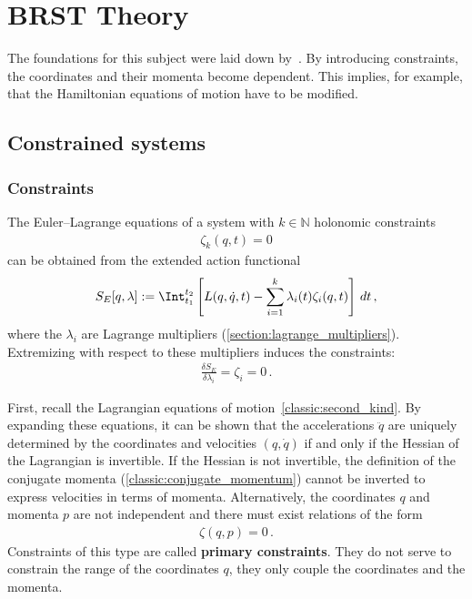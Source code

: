 \chapter{BRST Theory}\label{chapter:constrained_dynamics}

    The foundations for this subject were laid down by~\citet{dirac_generalized_1950}. By introducing constraints, the coordinates and their momenta become dependent. This implies, for example, that the Hamiltonian equations of motion have to be modified.

    \minitoc

\section{Constrained systems}\label{section:constrained_systems}
\subsection{Constraints}

    \begin{method}
        The Euler--Lagrange equations of a system with $k\in\mathbb{N}$ holonomic constraints
        \begin{gather}
            \zeta_k(q,t)=0
        \end{gather}
        can be obtained from the extended action functional
        \begin{gather}
            S_E[q,\lambda]:=\Int_{t_1}^{t_2}\left[L(q,\dot{q},t) - \sum_{i=1}^k\lambda_i(t)\zeta_i(q,t)\right]\,dt\,,
        \end{gather}
        where the $\lambda_i$ are Lagrange multipliers (\cref{section:lagrange_multipliers}). Extremizing with respect to these multipliers induces the constraints:
        \begin{gather}
            \frac{\delta S_E}{\delta\lambda_i}=\zeta_i=0\,.
        \end{gather}
    \end{method}

    First, recall the Lagrangian equations of motion~\eqref{classic:second_kind}. By expanding these equations, it can be shown that the accelerations $\ddot{q}$ are uniquely determined by the coordinates and velocities $(q,\dot{q})$ if and only if the Hessian of the Lagrangian is invertible. If the Hessian is not invertible, the definition of the conjugate momenta (\cref{classic:conjugate_momentum}) cannot be inverted to express velocities in terms of momenta. Alternatively, the coordinates $q$ and momenta $p$ are not independent and there must exist relations of the form
    \begin{gather}
        \zeta(q,p) = 0\,.
    \end{gather}
    Constraints of this type are called \textbf{primary constraints}. They do not serve to constrain the range of the coordinates $q$, they only couple the coordinates and the momenta.

